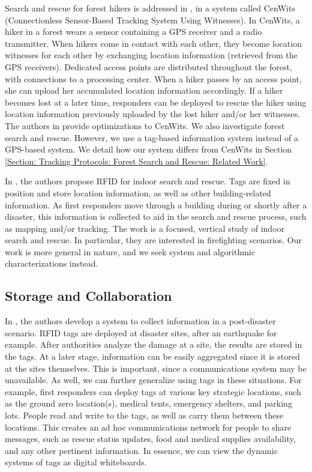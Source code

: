 Search and rescue for forest hikers is addressed in \cite{2005 Huang}, in a system called CenWits (Connectionless Sensor-Based Tracking System Using Witnesses).  In CenWits, a hiker in a forest wears a sensor containing a GPS receiver and a radio transmitter.  When hikers come in contact with each other, they become location witnesses for each other by exchanging location information (retrieved from the GPS receivers).  Dedicated access points are distributed throughout the forest, with connections to a processing center.  When a hiker passes by an access point, she can upload her accumulated location information accordingly.  If a hiker becomes lost at a later time, responders can be deployed to rescue the hiker using location information previously uploaded by the lost hiker and/or her witnesses.  The authors in \cite{2007 Zhuang} provide optimizations to CenWits. We also investigate forest search and rescue. However, we use a tag-based information system instead of a GPS-based system. We detail how our system differs from CenWits in Section \ref{Section: Tracking Protocols: Forest Search and Rescue: Related Work}.

In \cite{2006 Guerrieri}, the authors propose RFID for indoor search and rescue.  Tags are fixed in position and store location information, as well as other building-related information.  As first responders move through a building during or shortly after a disaster, this information is collected to aid in the search and rescue process, such as mapping and/or tracking. The work is a focused, vertical study of indoor search and rescue. In particular, they are interested in firefighting scenarios. Our work is more general in nature, and we seek system and algorithmic characterizations instead.

\subsection{Storage and Collaboration}
In \cite{2008 Shibayama}, the authors develop a system to collect information in a post-disaster scenario.  RFID tags are deployed at disaster sites, after an earthquake for example.  After authorities analyze the damage at a site, the results are stored in the tags.  At a later stage, information can be easily aggregated since it is stored at the sites themselves.  This is important, since a communications system may be unavailable.  As well, we can further generalize using tags in these situations.  For example, first responders can deploy tags at various key strategic locations, such as the ground zero location(s), medical tents, emergency shelters, and parking lots.  People read and write to the tags, as well as carry them between these locations.  This creates an ad hoc communications network for people to share messages, such as rescue status updates, food and medical supplies availability, and any other pertinent information.  In essence, we can view the dynamic systems of tags as digital whiteboards.

